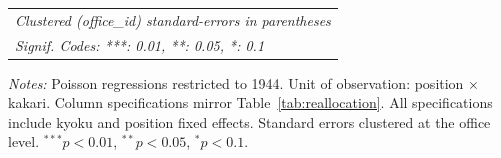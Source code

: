 \begin{table}[htbp]
\begin{threeparttable}
\begin{tabular}{lcccccccc}
   \midrule \midrule
   \multicolumn{9}{l}{\emph{Clustered (office\_id) standard-errors in parentheses}}\\
   \multicolumn{9}{l}{\emph{Signif. Codes: ***: 0.01, **: 0.05, *: 0.1}}\\
\end{tabular}
\par\endgroup
\begin{tablenotes}[flushleft]
\footnotesize
\item \textit{Notes:} Poisson regressions restricted to 1944. Unit of observation: position $\times$ kakari. Column specifications mirror Table~\ref{tab:reallocation}. All specifications include kyoku and position fixed effects. Standard errors clustered at the office level. $^{***}p<0.01$, $^{**}p<0.05$, $^{*}p<0.1$.
\end{tablenotes}
\end{threeparttable}
\end{table}
